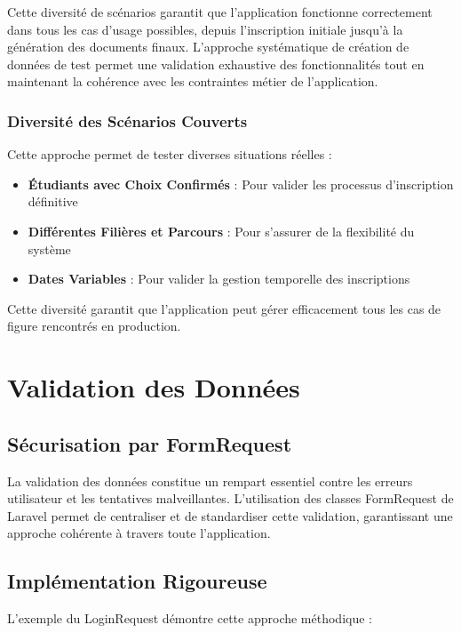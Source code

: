 \documentclass[12pt,a4paper]{report}
\begin{document}
Cette diversité de scénarios garantit que l'application fonctionne correctement dans tous les cas d'usage possibles, depuis l'inscription initiale jusqu'à la génération des documents finaux. L'approche systématique de création de données de test permet une validation exhaustive des fonctionnalités tout en maintenant la cohérence avec les contraintes métier de l'application.

\subsubsection{Diversité des Scénarios Couverts}

Cette approche permet de tester diverses situations réelles :

\begin{itemize}
\item \textbf{Étudiants avec Choix Confirmés} : Pour valider les processus d'inscription définitive
\item \textbf{Différentes Filières et Parcours} : Pour s'assurer de la flexibilité du système
\item \textbf{Dates Variables} : Pour valider la gestion temporelle des inscriptions
\end{itemize}

Cette diversité garantit que l'application peut gérer efficacement tous les cas de figure rencontrés en production.

\section{Validation des Données}

\subsection{Sécurisation par FormRequest}

La validation des données constitue un rempart essentiel contre les erreurs utilisateur et les tentatives malveillantes. L'utilisation des classes FormRequest de Laravel permet de centraliser et de standardiser cette validation, garantissant une approche cohérente à travers toute l'application.

\subsection{Implémentation Rigoureuse}

L'exemple du LoginRequest démontre cette approche méthodique :
\end{document}

